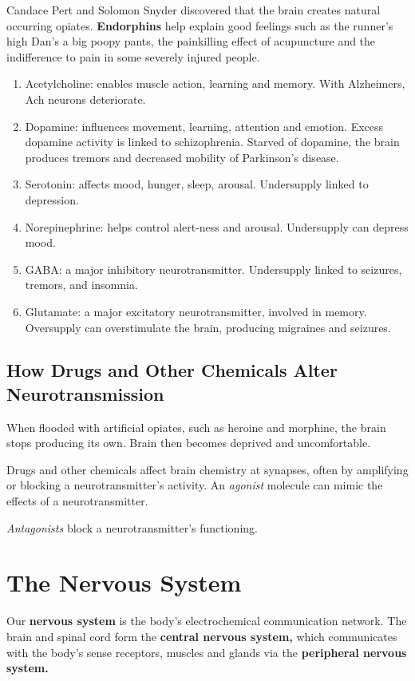 Candace Pert and Solomon Snyder discovered that the brain creates natural occurring opiates. \textbf{Endorphins} help explain good feelings such as the runner's high Dan's a big poopy pants, the painkilling effect of acupuncture and the indifference to pain in some severely injured people. 

\begin{enumerate}
\item Acetylcholine: enables muscle action, learning and memory. With Alzheimers, Ach neurons deteriorate.
\item Dopamine: influences movement, learning, attention and emotion. Excess dopamine activity is linked to schizophrenia. Starved of dopamine, the brain produces tremors and decreased mobility of Parkinson's disease. 
\item Serotonin: affects mood, hunger, sleep, arousal. Undersupply linked to depression.
\item Norepinephrine: helps control alert-ness and arousal. Undersupply can depress mood. 
\item GABA: a major inhibitory neurotransmitter. Undersupply linked to seizures, tremors, and insomnia. 
\item Glutamate: a major excitatory neurotransmitter, involved in memory. Oversupply can overstimulate the brain, producing migraines and seizures. 
\end{enumerate}

\subsection*{How Drugs and Other Chemicals Alter Neurotransmission}
When flooded with artificial opiates, such as heroine and morphine, the brain stops producing its own. Brain then becomes deprived and uncomfortable.

Drugs and other chemicals affect brain chemistry at synapses, often by amplifying or blocking a neurotransmitter's activity. An \textit{agonist} molecule can mimic the effects of a neurotransmitter.

\textit{Antagonists} block a neurotransmitter's functioning. 

\section*{The Nervous System}
Our \textbf{nervous system} is the body's electrochemical communication network. The brain and spinal cord form the \textbf{central nervous system,} which communicates with the body's sense receptors, muscles and glands via the \textbf{peripheral nervous system.} 

